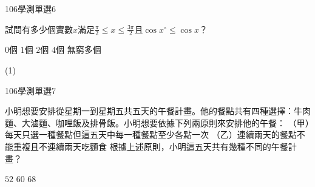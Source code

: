\begin{QUESTIONS}
\begin{QUESTION}
\begin{QSOLLIST}
        \end{QSOLLIST}
        \begin{QEMPTYSPACE}
        \end{QEMPTYSPACE}
    \end{QUESTION}
    \begin{QUESTION}
        \begin{ExamInfo}{106}{學測}{單選}{6}
        \end{ExamInfo}
        \begin{ExamAnsRateInfo}{22}{43}{16}{7}
        \end{ExamAnsRateInfo}
        \begin{QBODY}
		    試問有多少個實數$x$滿足$\frac{\pi }{2}\le x\le \frac{3\pi }{2}$且$\cos x{}^\circ \le \cos x$？
			\begin{QOPS}
				\QOP $0$個     
				\QOP $1$個     
				\QOP $2$個     
				\QOP $4$個     
				\QOP 無窮多個
			\end{QOPS}
        \end{QBODY}
        \begin{QFROMS}
        \end{QFROMS}
        \begin{QTAGS}\end{QTAGS}
        \begin{QANS}
            (1)
        \end{QANS}
        \begin{QSOLLIST}
        \end{QSOLLIST}
        \begin{QEMPTYSPACE}
        \end{QEMPTYSPACE}
    \end{QUESTION}
    \begin{QUESTION}
        \begin{ExamInfo}{106}{學測}{單選}{7}
        \end{ExamInfo}
        \begin{ExamAnsRateInfo}{29}{40}{27}{20}
        \end{ExamAnsRateInfo}
        \begin{QBODY}
			小明想要安排從星期一到星期五共五天的午餐計畫。他的餐點共有四種選擇：牛肉麵、大滷麵、咖哩飯及排骨飯。小明想要依據下列兩原則來安排他的午餐：
			（甲）每天只選一種餐點但這五天中每一種餐點至少各點一次
			（乙）連續兩天的餐點不能重複且不連續兩天吃麵食
			根據上述原則，小明這五天共有幾種不同的午餐計畫？
			\begin{QOPS}
				\QOP $52$      
				\QOP $60$      
				\QOP $68$      

\end{QOPS}
\end{QBODY}
\end{QUESTION}
\end{QUESTIONS}
